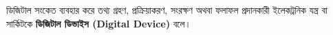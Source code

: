 
\par\begingroup
{}


ডিজিটাল সংকেত ব্যবহার করে তথ্য গ্রহণ, প্রক্রিয়াকরণ,
সংরক্ষণ অথবা ফলাফল প্রদানকারী ইলেকট্রনিক যন্ত্র বা সার্কিটকে
\textbf{ডিজিটাল ডিভাইস
(\textenglish{Digital Device})} বলে।

\par\endgroup



